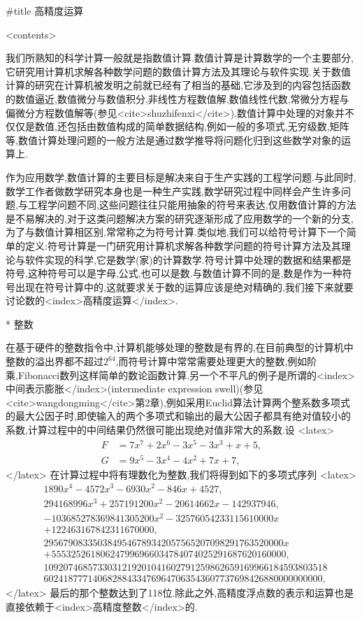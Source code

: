 #title 高精度运算

<contents>

我们所熟知的科学计算一般就是指数值计算.数值计算是计算数学的一个主要部分,它研究用计算机求解各种数学问题的数值计算方法及其理论与软件实现.关于数值计算的研究在计算机被发明之前就已经有了相当的基础,它涉及到的内容包括函数的数值逼近,数值微分与数值积分,非线性方程数值解,数值线性代数,常微分方程与偏微分方程数值解等(参见<cite>shuzhifenxi</cite>).数值计算中处理的对象并不仅仅是数值,还包括由数值构成的简单数据结构,例如一般的多项式,无穷级数,矩阵等,数值计算处理问题的一般方法是通过数学推导将问题化归到这些数学对象的运算上.

作为应用数学,数值计算的主要目标是解决来自于生产实践的工程学问题.与此同时,数学工作者做数学研究本身也是一种生产实践,数学研究过程中同样会产生许多问题,与工程学问题不同,这些问题往往只能用抽象的符号来表达,仅用数值计算的方法是不易解决的,对于这类问题解决方案的研究逐渐形成了应用数学的一个新的分支,为了与数值计算相区别,常常称之为符号计算.类似地,我们可以给符号计算下一个简单的定义:符号计算是一门研究用计算机求解各种数学问题的符号计算方法及其理论与软件实现的科学,它是数学(家)的计算数学.符号计算中处理的数据和结果都是符号,这种符号可以是字母,公式,也可以是数.与数值计算不同的是,数是作为一种符号出现在符号计算中的,这就要求关于数的运算应该是绝对精确的,我们接下来就要讨论数的<index>高精度运算</index>.

* 整数

在基于硬件的整数指令中,计算机能够处理的整数是有界的,在目前典型的计算机中整数的溢出界都不超过$2^{64}$,而符号计算中常常需要处理更大的整数,例如阶乘,Fibonacci数列这样简单的数论函数计算.另一个不平凡的例子是所谓的<index>中间表示膨胀</index>(intermediate expression swell)(参见<cite>wangdongming</cite>第2章),例如采用Euclid算法计算两个整系数多项式的最大公因子时,即使输入的两个多项式和输出的最大公因子都具有绝对值较小的系数,计算过程中的中间结果仍然很可能出现绝对值非常大的系数.设
<latex>
\begin{align*}
  F&=7x^7+2x^6-3x^5-3x^3+x+5,\\
G&=9x^5-3x^4-4x^2+7x+7,
\end{align*}
</latex>
在计算过程中将有理数化为整数,我们将得到如下的多项式序列
<latex>
\begin{align*}
&1890x^4-4572x^3-6930x^2-846x+4527,\\
&294168996x^3+257191200x^2-20614662x-142937946,\\
&-103685278369841305200x^2-32576054233115610000x\\
&+122463167842311670000,\\
&2956790833503849546789342057565207098291763520000x\\
&+555325261806247996966034784074025291687620160000,\\
&1092074685733031219201041602791259862659169966184593803518\\
&602418777140682884334769647063543607737698426880000000000,
\end{align*}
</latex>
最后的那个整数达到了118位.除此之外,高精度浮点数的表示和运算也是直接依赖于<index>高精度整数</index>的.

